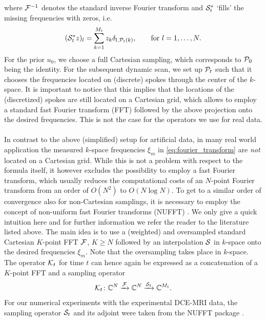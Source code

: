 where $\mathcal{F}^{-1}$ denotes the standard inverse Fourier transform and $\mathcal{S}_t^*$ `fills' the missing frequencies with zeros, i.e. 
\begin{align*}
 (\mathcal{S}_t^*z)_l = \sum_{k=1}^{M_t} z_k \delta_{l,\mathcal{P}_t(k)}, \qquad \text{for } l = 1, \dots, N.
\end{align*}
For the prior $u_0$, we choose a full Cartesian sampling, which corresponds to $\mathcal{P}_0$ being the identity. For the subsequent dynamic scan, we set up $\mathcal{P}_t$ such that it chooses the frequencies located on (discrete) spokes through the center of the $k$-space.     
It is important to notice that this implies that the locations of the (discretized) spokes are still located on a Cartesian grid, which allows to employ a standard fast Fourier transform (FFT) followed by the above projection onto the desired frequencies. 
This is not the case for the operators we use for real data. \\

\\ 
\noindent 
In contrast to the above (simplified) setup for artificial data, in many real world application the measured $k$-space frequencies $\xi_m$ in \eqref{eq:fourier_transform} are {\it not} located on a Cartesian grid. 
While this is not a problem with respect to the formula itself, it however excludes the possibility to employ a fast Fourier transform, 
which usually reduces the computational costs of an $N$-point Fourier transform from an order of $O(N^2)$ to $O(N \log N)$.
To get to a similar order of convergence also for non-Cartesian samplings, it is necessary to employ the concept of non-uniform fast Fourier transforms (NUFFT) \cite{Fessler:NUFFT,Fessler:code,Matej2004,Nguyen:1999,Strohmer2000}. 
We only give a quick intuition here and for further information we refer the reader to the literature listed above. 
The main idea is to use a (weighted) and oversampled standard Cartesian $K$-point FFT $\mathcal{F}$, $K \geq N$ followed by an interpolation $\mathcal{S}$ in $k$-space onto the desired frequencies $\xi_m$. 
Note that the oversampling takes place in $k$-space.
The operator $\mathcal{K}_t$ for time $t$ can hence again be expressed as a concatenation of a $K$-point FFT and a sampling operator 
\textbf{\begin{align*}
 \mathcal{K}_t \colon \mathbb{C}^N \xrightarrow{\mathcal{F}} \mathbb{C}^N \xrightarrow{\mathcal{S}_t} \mathbb{C}^{M_t}.
\end{align*}}
For our numerical experiments with the experimental DCE-MRI data, the sampling operator $\mathcal{S}_t$ and its adjoint were taken from the NUFFT package \cite{Fessler:code}.

